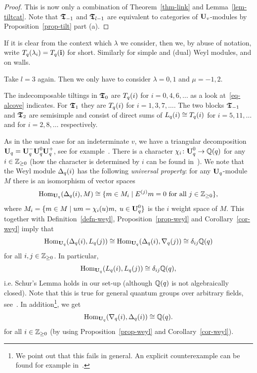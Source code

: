 \begin{proof}
This is now only a 
combination of Theorem~\ref{thm-link} and 
Lemma~\ref{lem-tiltcat}. Note that 
$\boldsymbol{\mathfrak{T}}_{-1}$ and $\boldsymbol{\mathfrak{T}}_{l-1}$ are equivalent 
to categories of $\boldsymbol{\mathrm{U}}_v$-modules by Proposition~\ref{prop-tilt} part (a).
\end{proof}



\begin{nota}\label{no-linkb}
If it is clear from the context 
which $\lambda$ we consider, then we, 
by abuse of notation, write 
$T_q({\lambda_i})=T_q({\boldsymbol{\mathrm{i}}})$ for short. Similarly for simple and (dual) 
Weyl modules, and on walls.
\end{nota}



\begin{ex}\label{ex-block}
Take $l=3$ again. Then we only have to consider
$\lambda=0,1$ and $\mu=-1,2$.



The indecomposable tiltings in $\boldsymbol{\mathfrak{T}}_0$ are 
$T_q({i})$ for $i=0,4,6,\dots$ as a look 
at~\eqref{eq-alcove} indicates. For $\boldsymbol{\mathfrak{T}}_1$ 
they are $T_q({i})$ for $i=1,3,7,\dots$. The 
two blocks $\boldsymbol{\mathfrak{T}}_{-1}$ and $\boldsymbol{\mathfrak{T}}_2$ are semisimple 
and consist of direct sums of $L_q({i})\cong T_q({i})$ 
for $i=5,11,\dots$ and for $i=2,8,\dots$ respectively.
\end{ex}



\begin{rem}\label{rem-tria}
As in the usual case for an 
indeterminate $v$, we have a 
triangular decomposition
$\boldsymbol{\mathrm{U}}_q=\boldsymbol{\mathrm{U}}_q^-\boldsymbol{\mathrm{U}}_q^0\boldsymbol{\mathrm{U}}_q^+$, see for example~\cite[Section~1]{apw}. 
There is a character $\chi_i\colon \boldsymbol{\mathrm{U}}_q^0\to\mathbb{Q}(q)$ for any $i\in\mathbb{Z}_{\geq 0}$ 
(how the character is 
determined by $i$ can be found in~\cite[Lemma~1.1]{apw}).
We note that the Weyl module $\Delta_q({i})$ 
has the following \textit{universal property}: 
for any $\boldsymbol{\mathrm{U}}_q$-module $M$ there is an isomorphism of vector spaces
\[
\mathrm{Hom}_{\boldsymbol{\mathrm{U}}_q}(\Delta_q({i}),M)\cong\{m\in M_i\mid E^{(j)}m=0\text{ for all }j\in\mathbb{Z}_{\geq 0}\},
\]
where $M_i=\{m\in M\mid um=\chi_i(u)m,\; u\in\boldsymbol{\mathrm{U}}_q^0\}$ is the $i$ weight space 
of $M$.
This together with Definition~\ref{defn-weyl}, 
Proposition~\ref{prop-weyl} and Corollary~\ref{cor-weyl} imply that
\[
\mathrm{Hom}_{\boldsymbol{\mathrm{U}}_q}(\Delta_q({i}),L_q({j}))\cong\mathrm{Hom}_{\boldsymbol{\mathrm{U}}_q}(\Delta_q({i}),\nabla_q({j}))\cong\delta_{ij}\mathbb{Q}(q)
\]
for all $i,j\in\mathbb{Z}_{\geq 0}$. In particular,
\begin{equation}\label{eq-SchurLemma}
\mathrm{Hom}_{\boldsymbol{\mathrm{U}}_q}(L_q({i}),L_q({j}))\cong\delta_{ij}\mathbb{Q}(q),
\end{equation}
i.e. Schur's Lemma holds in our set-up (although $\mathbb{Q}(q)$ is not 
algebraically closed). Note that this is true for general quantum groups over 
arbitrary fields, see~\cite[Corollary~7.4]{apw}.
In addition\footnote{We point out that this fails in general. An explicit counterexample can be found for example in~\cite[Section~5]{ak}.}, we get
\[
\mathrm{Hom}_{\boldsymbol{\mathrm{U}}_q}(\nabla_q({i}),\Delta_q({i}))\cong\mathbb{Q}(q).
\]
for all $i\in\mathbb{Z}_{\geq 0}$ (by using 
Proposition~\ref{prop-weyl} and Corollary~\ref{cor-weyl}).
\end{rem}



